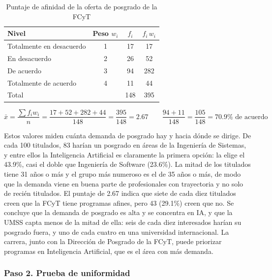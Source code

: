 \documentclass[12pt, a4paper]{article}
\newenvironment{mitabla}[2][H]{%
  \begin{table}[#1]
  \centering
  \caption{#2}
  \small
}{%
  \end{table}
}
\begin{document}
\begin{mitabla}{Puntaje de afinidad de la oferta de posgrado de la FCyT}\label{tab:a2-pond}
\begin{tabular}{lccc}
\toprule
\textbf{Nivel} & \textbf{Peso $w_i$} & \textbf{$f_i$} & \textbf{$f_i \, w_i$} \\
\midrule
Totalmente en desacuerdo & 1 & 17 & 17 \\
En desacuerdo & 2 & 26 & 52 \\
De acuerdo & 3 & 94 & 282 \\
Totalmente de acuerdo & 4 & 11 & 44 \\
\midrule
Total & & 148 & 395 \\
\bottomrule
\end{tabular}
\end{mitabla}

\[
\bar{x} = \frac{\sum f_i w_i}{n} = \frac{17 + 52 + 282 + 44}{148} = \frac{395}{148} = 2.67
\qquad
\frac{94 + 11}{148} = \frac{105}{148} = 70.9\% \text{ de acuerdo}
\]

Estos valores miden cuánta demanda de posgrado hay y hacia dónde se
dirige. De cada 100 titulados, 83 harían un posgrado en áreas de la
Ingeniería de Sistemas, y entre ellos la Inteligencia Artificial es
claramente la primera opción: la elige el 43.9\%, casi el doble que
Ingeniería de Software (23.6\%). La mitad de los titulados tiene 31 años
o más y el grupo más numeroso es el de 35 años o más, de modo que la
demanda viene en buena parte de profesionales con trayectoria y no solo
de recién titulados. El puntaje de 2.67 indica que siete de cada diez
titulados creen que la FCyT tiene programas afines, pero 43 (29.1\%) creen
que no. Se concluye que la demanda de posgrado es alta y se concentra en
IA, y que la UMSS capta menos de la mitad de ella: seis de cada diez
interesados harían su posgrado fuera, y uno de cada cuatro en una
universidad internacional. La carrera, junto con la Dirección de Posgrado
de la FCyT, puede priorizar programas en Inteligencia Artificial, que es
el área con más demanda.

\subsubsection{Paso 2. Prueba de uniformidad}
\end{document}
